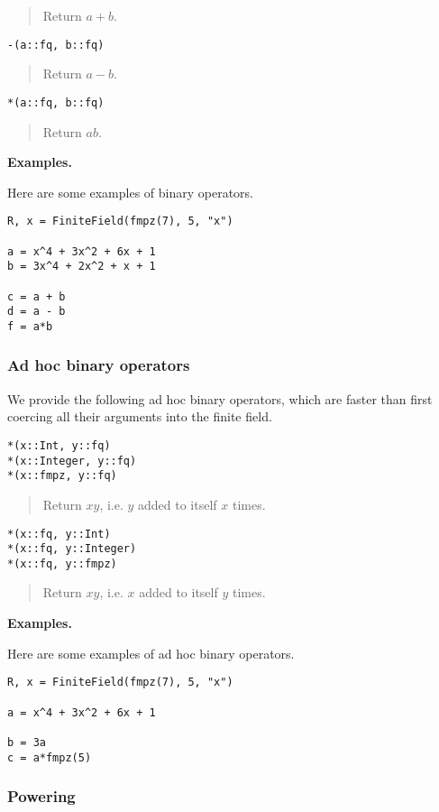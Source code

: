 \documentclass[a4paper,10pt]{article}
\newcommand{\desc}[1]{\vspace{-3mm}\begin{quote}#1\end{quote}}
\begin{document}
{{\desc{Return $a + b$.}

\begin{lstlisting}
-(a::fq, b::fq)
\end{lstlisting}

\desc{Return $a - b$.}

\begin{lstlisting}
*(a::fq, b::fq)
\end{lstlisting}

\desc{Return $ab$.}

\textbf{Examples.}

Here are some examples of binary operators.

\begin{lstlisting}
R, x = FiniteField(fmpz(7), 5, "x")

a = x^4 + 3x^2 + 6x + 1
b = 3x^4 + 2x^2 + x + 1

c = a + b
d = a - b
f = a*b
\end{lstlisting}

\subsubsection{Ad hoc binary operators}

We provide the following ad hoc binary operators, which are faster than first
coercing all their arguments into the finite field.

\begin{lstlisting}
*(x::Int, y::fq)
*(x::Integer, y::fq)
*(x::fmpz, y::fq)
\end{lstlisting}

\desc{Return $xy$, i.e. $y$ added to itself $x$ times.}

\begin{lstlisting}
*(x::fq, y::Int)
*(x::fq, y::Integer)
*(x::fq, y::fmpz)
\end{lstlisting}

\desc{Return $xy$, i.e. $x$ added to itself $y$ times.}

\textbf{Examples.}

Here are some examples of ad hoc binary operators.

\begin{lstlisting}
R, x = FiniteField(fmpz(7), 5, "x")

a = x^4 + 3x^2 + 6x + 1

b = 3a
c = a*fmpz(5)
\end{lstlisting}

\subsubsection{Powering}

}}
\end{document}
